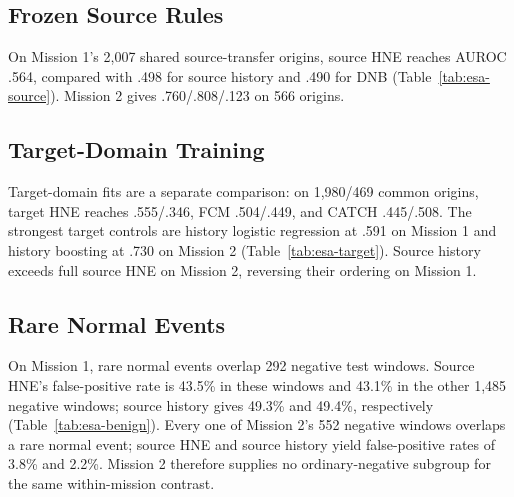 \subsection{Frozen Source Rules}
On Mission 1's 2,007 shared source-transfer origins, source HNE reaches AUROC .564, compared with .498 for source history and .490 for DNB (Table~\ref{tab:esa-source}). Mission 2 gives .760/.808/.123 on 566 origins. 

\begin{table}[!htb]
\centering
\caption{Frozen human-source rules on ESA expert events. Thresholds use validation-negative percentiles.}
\label{tab:esa-source}
\end{table}

\subsection{Target-Domain Training}
Target-domain fits are a separate comparison: on 1,980/469 common origins, target HNE reaches .555/.346, FCM .504/.449, and CATCH .445/.508. The strongest target controls are history logistic regression at .591 on Mission 1 and history boosting at .730 on Mission 2 (Table~\ref{tab:esa-target}). Source history exceeds full source HNE on Mission 2, reversing their ordering on Mission 1.

\begin{table}[!htb]
\centering
\caption{ESA target-trained models on common origins. Neural methods average three seeds; intervals resample 64-day blocks.}
\label{tab:esa-target}
\end{table}

\subsection{Rare Normal Events}
On Mission 1, rare normal events overlap 292 negative test windows. Source HNE's false-positive rate is 43.5\% in these windows and 43.1\% in the other 1,485 negative windows; source history gives 49.3\% and 49.4\%, respectively (Table~\ref{tab:esa-benign}). Every one of Mission 2's 552 negative windows overlaps a rare normal event; source HNE and source history yield false-positive rates of 3.8\% and 2.2\%. Mission 2 therefore supplies no ordinary-negative subgroup for the same within-mission contrast.

\begin{table}[!htb]
\centering
\caption{False alarms during expert-labelled rare normal events and other negative windows. Thresholds are fixed before testing.}
\label{tab:esa-benign}
\end{table}
